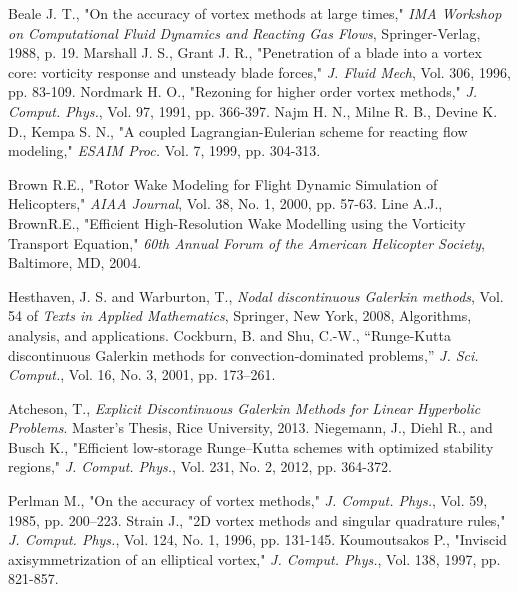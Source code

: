 \documentclass[]{aiaa-tc}%
\begin{document}
\begin{thebibliography}{9}
Beale J. T., "On the accuracy of vortex methods at large times,"  \textit{IMA Workshop on Computational Fluid Dynamics and Reacting Gas Flows}, Springer-Verlag, 1988, p. 19.
Marshall J. S., Grant J. R., "Penetration of a blade into a vortex core: vorticity response and unsteady blade forces," \textit{J. Fluid Mech}, Vol. 306, 1996, pp. 83-109.
Nordmark H. O., "Rezoning for higher order vortex methods," \textit{J. Comput. Phys.}, Vol. 97, 1991, pp. 366-397.
Najm H. N., Milne R. B., Devine K. D., Kempa S. N., "A coupled Lagrangian-Eulerian scheme for reacting flow modeling," \textit{ESAIM Proc.} Vol. 7, 1999, pp. 304-313.

Brown R.E., "Rotor Wake Modeling for Flight Dynamic Simulation of Helicopters," \textit{AIAA Journal}, Vol. 38, No. 1, 2000, pp. 57-63.
Line A.J., BrownR.E., "Efficient High-Resolution Wake Modelling using the Vorticity Transport Equation," \textit{60th Annual Forum of the American Helicopter Society}, Baltimore, MD, 2004.

Hesthaven, J. S. and Warburton, T., \textit{Nodal discontinuous Galerkin methods}, Vol. 54 of \textit{Texts in Applied Mathematics}, Springer, New York, 2008, Algorithms, analysis, and applications.
Cockburn, B. and Shu, C.-W., “Runge-Kutta discontinuous Galerkin methods for convection-dominated problems,” \textit{J. Sci. Comput.}, Vol. 16, No. 3, 2001, pp. 173–261.

Atcheson, T., \textit{Explicit Discontinuous Galerkin Methods for Linear Hyperbolic Problems}. Master's Thesis, Rice University, 2013.
Niegemann, J., Diehl R., and Busch K., "Efficient low-storage Runge–Kutta schemes with optimized stability regions," \textit{J. Comput. Phys.}, Vol. 231, No. 2, 2012, pp. 364-372.

Perlman M., "On the accuracy of vortex methods," \textit{J. Comput. Phys.}, Vol. 59, 1985, pp. 200–223.
Strain J., "2D vortex methods and singular quadrature rules," \textit{J. Comput. Phys.}, Vol. 124, No. 1, 1996, pp. 131-145.
Koumoutsakos P., "Inviscid axisymmetrization of an elliptical vortex," \textit{J. Comput. Phys.}, Vol. 138, 1997, pp. 821-857.


\end{thebibliography}
\end{document}
